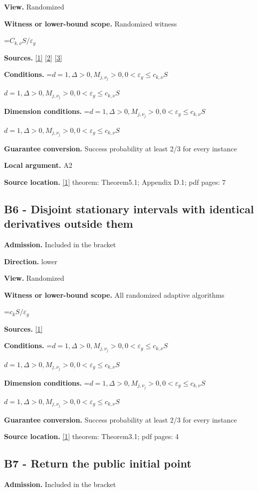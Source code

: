 \documentclass[10pt,a4paper]{article}
\newcommand{\AtlasMath}[1]{\par\begingroup\centering\setbox0=\hbox{$\displaystyle #1$}\ifdim\wd0>1.4\linewidth\typeout{ATLAS WIDE FORMULA: \the\wd0}\fi\ifdim\wd0>\linewidth\resizebox{\linewidth}{!}{\box0}\else\box0\fi\par\endgroup}
\newcommand{\AtlasInlineMath}[1]{\begingroup\setbox0=\hbox{$#1$}\ifdim\wd0>.4\linewidth\endgroup\AtlasMath{#1}\else\endgroup$#1$\fi}
\begin{document}
\textbf{View.} Randomized

\textbf{Witness or lower-bound scope.} Randomized witness

\AtlasMath{C_{k,\nu} S/\varepsilon_g}
\textbf{Sources.} \href{https://arxiv.org/abs/2610.16295}{[1]} \href{https://arxiv.org/abs/1710.11606v3}{[2]} \href{https://arxiv.org/abs/1811.01220}{[3]}

\textbf{Conditions.} \AtlasInlineMath{d=1,\Delta>0,M_{j,\nu_j}>0,0<\varepsilon_g\le c_{k,\nu}S}

\textbf{Dimension conditions.} \AtlasInlineMath{d=1,\Delta>0,M_{j,\nu_j}>0,0<\varepsilon_g\le c_{k,\nu}S}

\textbf{Guarantee conversion.} Success probability at least 2/3 for every instance

\textbf{Local argument.} A2

\textbf{Source location.} \href{https://arxiv.org/abs/2610.16295}{[1]} theorem: Theorem5.1; Appendix D.1; pdf pages: 7

\subsection{B6 - Disjoint stationary intervals with identical derivatives outside them}
\textbf{Admission.} Included in the bracket

\textbf{Direction.} lower

\textbf{View.} Randomized

\textbf{Witness or lower-bound scope.} All randomized adaptive algorithms

\AtlasMath{c_k S/\varepsilon_g}
\textbf{Sources.} \href{https://arxiv.org/abs/2610.16295}{[1]}

\textbf{Conditions.} \AtlasInlineMath{d=1,\Delta>0,M_{j,\nu_j}>0,0<\varepsilon_g\le c_{k,\nu}S}

\textbf{Dimension conditions.} \AtlasInlineMath{d=1,\Delta>0,M_{j,\nu_j}>0,0<\varepsilon_g\le c_{k,\nu}S}

\textbf{Guarantee conversion.} Success probability at least 2/3 for every instance

\textbf{Source location.} \href{https://arxiv.org/abs/2610.16295}{[1]} theorem: Theorem3.1; pdf pages: 4

\subsection{B7 - Return the public initial point}
\textbf{Admission.} Included in the bracket
\end{document}
